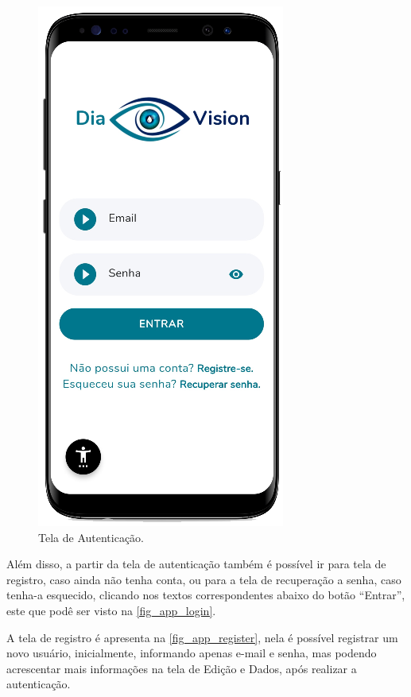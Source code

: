 \begin{figure}[htb]
    \caption{\label{fig_app_login}Tela de Autenticação.}
    \begin{center}
        \includegraphics[scale=0.70]{Imagens/desenvolvimento/app/app_login.png}
    \end{center}
\end{figure}

Além disso, a partir da tela de autenticação também é possível ir para tela de registro,
caso ainda não tenha conta, ou para a tela de recuperação a senha, caso tenha-a esquecido,
clicando nos textos correspondentes abaixo do botão ``Entrar'', este que podê ser visto na
\autoref{fig_app_login}.

\newpage

A tela de registro é apresenta na \autoref{fig_app_register}, nela é possível registrar um novo usuário,
inicialmente, informando apenas e-mail e senha, mas podendo acrescentar mais informações  na tela de Edição
e Dados, após realizar a autenticação.

